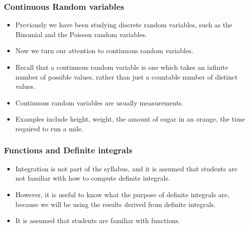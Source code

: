 \documentclass[IntroMain.tex]{subfiles}
\begin{document}
\begin{frame}
	\frametitle{Continuous Random variables}
	\begin{itemize}
		\item Previously we have been studying discrete random variables, such as the Binomial and the Poisson random variables.
		\item Now we turn our attention to continuous random variables.
		\item Recall that a continuous random variable is one which takes an infinite number of possible values, rather than just a countable number of distinct values.
		\item Continuous random variables are usually measurements.
		\item Examples include height, weight, the amount of sugar in an orange, the time required to run a mile.
	\end{itemize}
\end{frame}
\begin{frame}
	\frametitle{Functions and Definite integrals}
	\begin{itemize}
		\item Integration is not part of the syllabus, and it is assumed that students are not familiar with how to compute definite integrals.
		\item However,  it is useful to know what the purpose of definite integrals are, because we will be using the results derived from definite integrals. \item It is assumed that students are familiar with functions.
	\end{itemize}
\end{frame}
\end{document}
